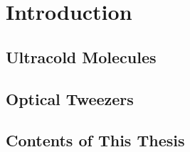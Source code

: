 
\chapter{Introduction}
\label{ch:introduction}


\section{Ultracold Molecules}
\label{ch:introduction:molecules}

\section{Optical Tweezers}
\label{ch:introduction:tweezers}

\section{Contents of This Thesis}
\label{ch:introduction:contents}
